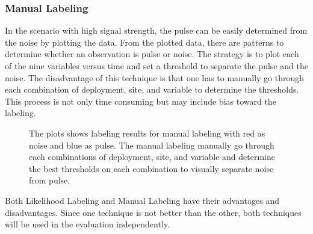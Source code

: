 \documentclass[twoside]{article}
\begin{document}
\subsubsection{Manual Labeling}
In the scenario with high signal strength, the pulse can be easily determined from the noise by plotting the data. From the plotted data, there are patterns to determine whether an observation is pulse or noise. The strategy is to plot each of the nine variables versus time and set a threshold to separate the pulse and the noise. The disadvantage of this technique is that one has to manually go through each combination of deployment, site, and variable to determine the thresholds. This process is not only time consuming but may include bias toward the labeling. 

\begin{figure}[ht!]
     \begin{center}
%
    \end{center}
    \caption{%
        The plots shows labeling results for manual labeling with red as noise and blue as pulse. The manual labeling manually go through each combinations of deployment, site, and variable and determine the best thresholds on each combination to visually separate noise from pulse. 
     }%
   \label{fig:subfigures}
\end{figure}

\hfill \break
\noindent
Both Likelihood Labeling and Manual Labeling have their advantages and disadvantages. Since one technique is not better than the other, both techniques will be used in the evaluation independently.
\end{document}
